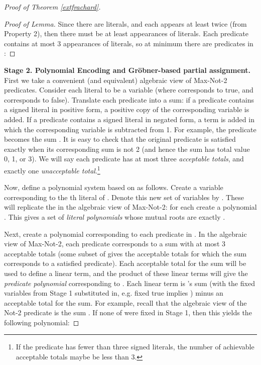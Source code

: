 \documentclass{article}
\begin{document}
\begin{proof}[Proof of Theorem \ref{extfrachard}]
\begin{proof}[Proof of Lemma] Since there are  literals, and each appears at least twice (from Property 2), then there must be at least  appearances of literals. Each predicate contains at most 3 appearances of literals, so at minimum there are  predicates in :
\vspace{-4mm}

\end{proof}

\noindent \textbf{Stage 2. Polynomial Encoding and Gr\"{o}bner-based partial assignment.} 
First we take a convenient (and equivalent) algebraic view of Max-Not-2 predicates.  Consider each literal  to be a  variable  (where  corresponds to  true, and  corresponds to  false). Translate each predicate into a sum:  if a predicate contains a signed literal in positive form, a positive copy of the corresponding variable is added. If a predicate contains a signed literal in negated form, a term is added in which the corresponding variable is subtracted from 1. For example, the predicate  becomes the sum . It is easy to check that the original predicate is satisfied exactly when its corresponding sum is not 2 (and hence the sum has total value 0, 1, or 3). We will say each predicate has at most three \emph{acceptable totals}, and exactly one \emph{unacceptable total}.\footnote{If the predicate has fewer than three signed literals, the number of achievable acceptable totals maybe be less than 3.}


Now, define a polynomial system based on  as follows. Create a variable  corresponding to the th literal of . Denote this new set of variables by . These  will replicate the  in the algebraic view of Max-Not-2: for each  create a polynomial . This gives a set of  \emph{literal polynomials} whose mutual roots are exactly .


Next, create a polynomial corresponding to each predicate in . In the algebraic view of Max-Not-2, each predicate  corresponds to a sum with at most 3 acceptable totals (some subset of  gives the acceptable totals for which the sum corresponds to a satisfied predicate). 
Each acceptable total for the sum 
will be used to define a linear term, and the product of these linear terms will give the \emph{predicate polynomial} corresponding to . Each linear term is 's sum (with the fixed variables from Stage 1 substituted in, e.g.  fixed true implies ) minus an acceptable total for the sum. For example, recall that the algebraic view of the Not-2 predicate  is the sum .
If none of  were fixed in Stage 1, then this yields the following polynomial:


\end{proof}
\end{document}
